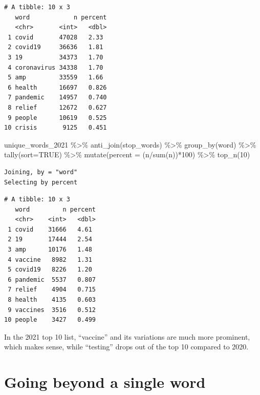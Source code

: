 \documentclass[
  letterpaper,
  DIV=11,
  numbers=noendperiod]{scrreprt}
\newenvironment{Shaded}{\begin{snugshade}}{\end{snugshade}}
\newcommand{\AttributeTok}[1]{\textcolor[rgb]{0.40,0.45,0.13}{#1}}
\newcommand{\ConstantTok}[1]{\textcolor[rgb]{0.56,0.35,0.01}{#1}}
\newcommand{\DecValTok}[1]{\textcolor[rgb]{0.68,0.00,0.00}{#1}}
\newcommand{\FunctionTok}[1]{\textcolor[rgb]{0.28,0.35,0.67}{#1}}
\newcommand{\NormalTok}[1]{\textcolor[rgb]{0.00,0.23,0.31}{#1}}
\newcommand{\SpecialCharTok}[1]{\textcolor[rgb]{0.37,0.37,0.37}{#1}}
\begin{document}
\begin{verbatim}
# A tibble: 10 x 3
   word            n percent
   <chr>       <int>   <dbl>
 1 covid       47028   2.33 
 2 covid19     36636   1.81 
 3 19          34373   1.70 
 4 coronavirus 34338   1.70 
 5 amp         33559   1.66 
 6 health      16697   0.826
 7 pandemic    14957   0.740
 8 relief      12672   0.627
 9 people      10619   0.525
10 crisis       9125   0.451
\end{verbatim}

\begin{Shaded}
\begin{Highlighting}[]
\NormalTok{unique\_words\_2021 }\SpecialCharTok{\%\textgreater{}\%}
  \FunctionTok{anti\_join}\NormalTok{(stop\_words) }\SpecialCharTok{\%\textgreater{}\%}
  \FunctionTok{group\_by}\NormalTok{(word) }\SpecialCharTok{\%\textgreater{}\%}
  \FunctionTok{tally}\NormalTok{(}\AttributeTok{sort=}\ConstantTok{TRUE}\NormalTok{) }\SpecialCharTok{\%\textgreater{}\%}
  \FunctionTok{mutate}\NormalTok{(}\AttributeTok{percent =}\NormalTok{ (n}\SpecialCharTok{/}\FunctionTok{sum}\NormalTok{(n))}\SpecialCharTok{*}\DecValTok{100}\NormalTok{) }\SpecialCharTok{\%\textgreater{}\%}
  \FunctionTok{top\_n}\NormalTok{(}\DecValTok{10}\NormalTok{)}
\end{Highlighting}
\end{Shaded}

\begin{verbatim}
Joining, by = "word"
Selecting by percent
\end{verbatim}

\begin{verbatim}
# A tibble: 10 x 3
   word         n percent
   <chr>    <int>   <dbl>
 1 covid    31666   4.61 
 2 19       17444   2.54 
 3 amp      10176   1.48 
 4 vaccine   8982   1.31 
 5 covid19   8226   1.20 
 6 pandemic  5537   0.807
 7 relief    4904   0.715
 8 health    4135   0.603
 9 vaccines  3516   0.512
10 people    3427   0.499
\end{verbatim}

In the 2021 top 10 list, ``vaccine'' and its variations are much more
prominent, which makes sense, while ``testing'' drops out of the top 10
compared to 2020.

\hypertarget{going-beyond-a-single-word}{%
\section{Going beyond a single word}\label{going-beyond-a-single-word}}
\end{document}
